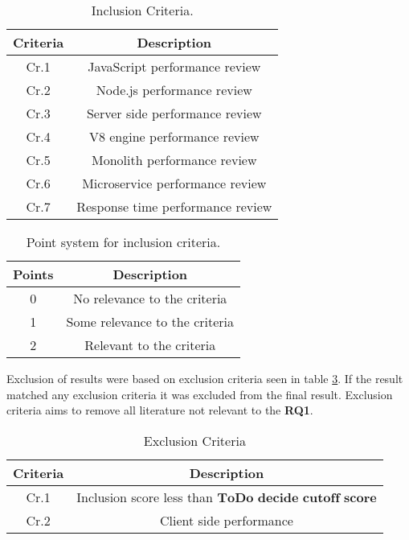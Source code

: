 \begin{table}[h!]
    \begin{tabular}{|c c|} 
        \hline
        Criteria & Description \\ [0.5ex] 
        \hline
        Cr.1 & JavaScript performance review
        \\ 
        \hline
        Cr.2 & Node.js performance review  \\ 
        \hline
        Cr.3 & Server side performance review  \\ 
        \hline
        Cr.4 & V8 engine performance review  \\ 
        \hline
        Cr.5 & Monolith performance review  \\ 
        \hline
        Cr.6 & Microservice performance review  \\ 
        \hline
        Cr.7 & Response time performance review  \\ 
        \hline
    \end{tabular}    
    \caption{Inclusion Criteria.}
    \label{table:literature:inclusionCriteria}
\end{table}

\begin{table}[h!]
    \begin{tabular}{|c c|}
        \hline
        Points & Description \\ [0.5ex] 
        \hline
         0 & No relevance to the criteria  \\ 
        \hline
         1 & Some relevance to the criteria \\ 
        \hline
        2 & Relevant to the criteria \\ 
        \hline
    \end{tabular}
    \caption{Point system for inclusion criteria.}
    \label{table:literature:pointSystem}
\end{table}

Exclusion of results were based on exclusion criteria seen in table \ref{table:literature:exclusionCriteria}.
If the result matched any exclusion criteria it was excluded from the final result.
Exclusion criteria aims to remove all literature not relevant to the \textbf{RQ1}.

\begin{table}[h!]
    \begin{tabular}{|c c|} 
        \hline
        Criteria & Description \\ [0.5ex] 
        \hline
        Cr.1 & Inclusion score less than $\textbf{ToDo decide cutoff score}$ \\
        \hline
        Cr.2 & Client side performance  \\
        \hline
    \end{tabular}    
    \caption{Exclusion Criteria}
    \label{table:literature:exclusionCriteria}
\end{table}

